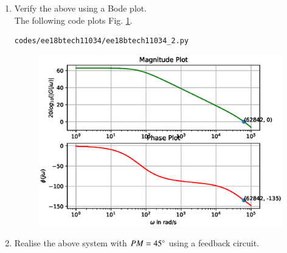 \begin{enumerate}[label=\arabic*.,ref=\theenumi]
\item Verify the above using a Bode plot. 
\\
\solution 
The following code plots  Fig. \ref{fig:ee18btech11034_2}.
%
\begin{lstlisting}
codes/ee18btech11034/ee18btech11034_2.py
\end{lstlisting}
%
\begin{figure}[!h]
\centering
\includegraphics[width=\columnwidth]{./figs/ee18btech11034/ee18btech11034_2.eps}
\caption{}
\label{fig:ee18btech11034_2}
\end{figure}
\item Realise the above system with $PM = 45 \degree$ using a feedback circuit.

\end{enumerate}
